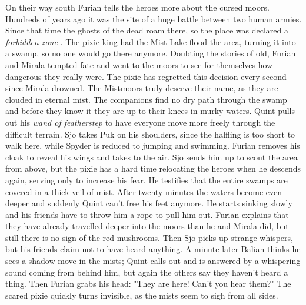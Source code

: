 On their way south Furian tells the heroes more about the cursed moors. Hundreds of years ago it was the site of a huge battle between two human armies. Since that time the ghosts of the dead roam there, so the place was declared a {\itshape forbidden zone} . The pixie king had the Mist Lake flood the area, turning it into a swamp, so no one would go there anymore. Doubting the stories of old, Furian and Mirala tempted fate and went to the moors to see for themselves how dangerous they really were. The pixie has regretted this decision every second since Mirala drowned. The Mistmoors truly deserve their name, as they are clouded in eternal mist. The companions find no dry path through the swamp and before they know it they are up to their knees in murky waters. Quint pulls out his {\itshape wand of featherstep} to have everyone move more freely through the difficult terrain. Sjo takes Puk on his shoulders, since the halfling is too short to walk here, while Spyder is reduced to jumping and swimming. Furian removes his cloak to reveal his wings and takes to the air. Sjo sends him up to scout the area from above, but the pixie has a hard time relocating the heroes when he descends again, serving only to increase his fear. He testifies that the entire swamps are covered in a thick veil of mist. After twenty minutes the waters become even deeper and suddenly Quint can't free his feet anymore. He starts sinking slowly and his friends have to throw him a rope to pull him out. Furian explains that they have already travelled deeper into the moors than he and Mirala did, but still there is no sign of the red mushrooms. Then Sjo picks up strange whispers, but his friends claim not to have heard anything. A minute later Balian thinks he sees a shadow move in the mists; Quint calls out and is answered by a whispering sound coming from behind him, but again the others say they haven't heard a thing. Then Furian grabs his head: "They are here! Can't you hear them?" The scared pixie quickly turns invisible, as the mists seem to sigh from all sides.\\

